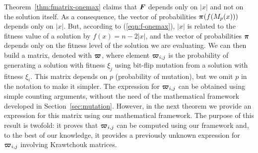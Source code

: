 \documentclass{article}
\def\vec#1{\mathchoice{\mbox{\boldmath$\displaystyle#1$}}
  {\mbox{\boldmath$\textstyle#1$}}
  {\mbox{\boldmath$\scriptstyle#1$}}
  {\mbox{\boldmath$\scriptscriptstyle#1$}}}
\begin{document}
Theorem~\ref{thm:fmatrix-onemax} claims that $\vec{F}$ depends only on $|x|$ and not on the solution itself. As a consequence, the vector of probabilities $\vec{\pi}(f(M_p(x)))$ depends only on $|x|$. But, according to (\ref{eqn:f-onemax}), $|x|$ is related to the fitness value of a solution by $f(x)=n-2|x|$, and the vector of probabilities $\vec{\pi}$ depends only on the fitness level of the solution we are evaluating. We can then build a matrix, denoted with $\vec{\varpi}$, where element $\vec{\varpi}_{i,j}$ is the probability of generating a solution with fitness $\xi_j$ using bit-flip mutation from a solution with fitness $\xi_i$. This matrix depends on $p$ (probability of mutation), but we omit $p$ in the notation to make it simpler. The expression for $\vec{\varpi}_{i,j}$ can be obtained using simple counting arguments, without the need of the mathematical framework developed in Section~\ref{sec:mutation}. However, in the next theorem we provide an expression for this matrix using our mathematical framework. The purpose of this result is twofold: it proves that  $\vec{\varpi}_{i,j}$ can be computed using our framework and, to the best of our knowledge, it provides a
previously unknown expression for $\vec{\varpi}_{i,j}$ involving Krawtchouk matrices. 
\end{document}
